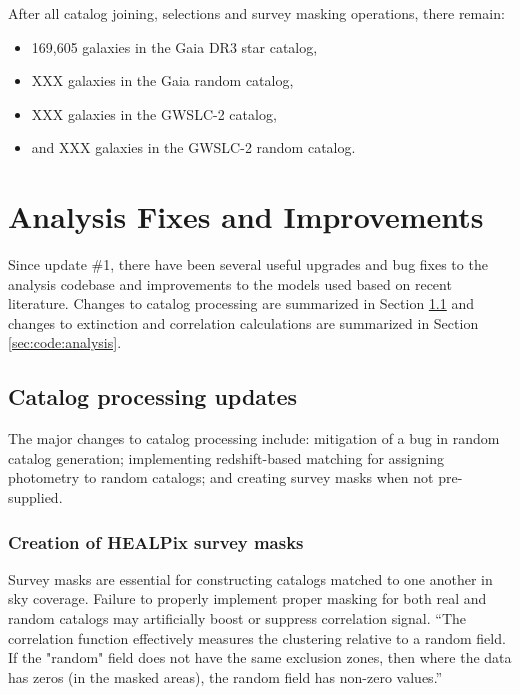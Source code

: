 \documentclass[11pt, oneside]{article}   	%
\begin{document}
After all catalog joining, selections and survey masking operations, there remain: 
\begin{itemize}
\item 169,605 galaxies in the Gaia DR3 star catalog,
\item XXX galaxies in the Gaia random catalog, 
\item XXX galaxies in the GWSLC-2 catalog, 
\item and XXX galaxies in the GWSLC-2 random catalog.
\end{itemize}




\section{Analysis Fixes and Improvements}\label{sec:code}

Since update \#1, there have been several useful upgrades and bug fixes to the analysis codebase and improvements to the models used based on recent literature. Changes to catalog processing are summarized in Section \ref{sec:code:catalogs} and changes to extinction and correlation calculations are summarized in Section \ref{sec:code:analysis}.

\subsection{Catalog processing updates}\label{sec:code:catalogs}

The major changes to catalog processing include: mitigation of a bug in random catalog generation; implementing redshift-based matching for assigning photometry to random catalogs; and creating survey masks when not pre-supplied. 

\subsubsection{Creation of HEALPix survey masks}\label{sec:code:healpix}

Survey masks are essential for constructing catalogs matched to one another in sky coverage. Failure to properly implement proper masking for both real and random catalogs may artificially boost or suppress correlation signal. 
``The correlation function effectively measures the clustering relative to a random field. If the "random" field does not have the same exclusion zones, then where the data has zeros (in the masked areas), the random field has non-zero values.'' 
\end{document}
